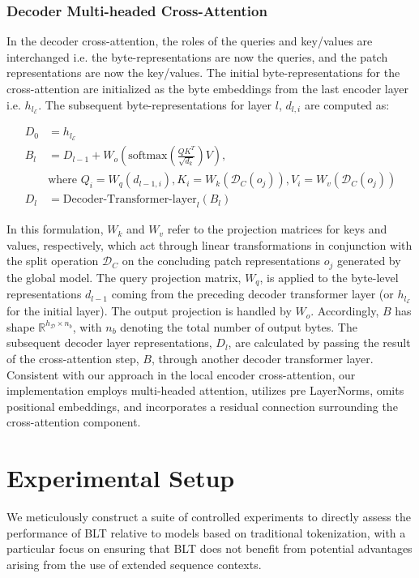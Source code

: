 \subsubsection{Decoder Multi-headed Cross-Attention} 

In the decoder cross-attention, the roles of the queries and key/values are interchanged i.e. the byte-representations are now the queries, and the patch representations are now the key/values. The initial byte-representations for the cross-attention are initialized as the byte embeddings from the last encoder layer i.e. $h_{l_{\mathcal{E}}}$. The subsequent byte-representations for layer $l$, $d_{l,i}$ are computed as:

\begin{align}
D_0 &= h_{l_{\mathcal{E}}} \\
B_l &= D_{l-1} + W_o\left(\text{softmax}\left(\frac{QK^T}{\sqrt{d_k}}\right)V\right), \\
  &\text{where } Q_i = W_q(d_{l-1,i}), K_i = W_k(\mathcal{D}_C(o_j)), V_i = W_v(\mathcal{D}_C(o_j)) \\
  D_l &= \text{Decoder-Transformer-layer}_l(B_l)
\end{align}

In this formulation, $W_k$ and $W_v$ refer to the projection matrices for keys and values, respectively, which act through linear transformations in conjunction with the split operation $\mathcal{D}_C$ on the concluding patch representations $o_j$ generated by the global model. The query projection matrix, $W_q$, is applied to the byte-level representations $d_{l-1}$ coming from the preceding decoder transformer layer (or $h_{l_{\mathcal{E}}}$ for the initial layer). The output projection is handled by $W_o$. Accordingly, $B$ has shape $\mathbb{R}^{h_{\mathcal{D}} \times n_b}$, with $n_b$ denoting the total number of output bytes. The subsequent decoder layer representations, $D_l$, are calculated by passing the result of the cross-attention step, $B$, through another decoder transformer layer. Consistent with our approach in the local encoder cross-attention, our implementation employs multi-headed attention, utilizes pre LayerNorms, omits positional embeddings, and incorporates a residual connection surrounding the cross-attention component.

\section{Experimental Setup}
\label{section:experiments}
We meticulously construct a suite of controlled experiments to directly assess the performance of {\textsc BLT} relative to models based on traditional tokenization, with a particular focus on ensuring that {\textsc BLT} does not benefit from potential advantages arising from the use of extended sequence contexts.

